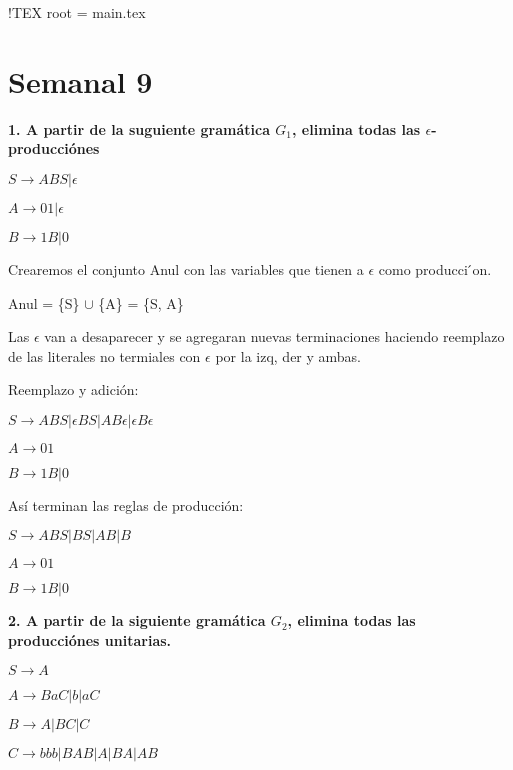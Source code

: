 !TEX root = main.tex
\renewcommand{\labelenumi}{\alph{enumi})}
\section*{Semanal 9}
\textbf{1. A partir de la suguiente gram\'atica $G_{1}$, elimina todas las $\epsilon$-producci\'ones}
\\
\begin{center}
    $S \rightarrow ABS | \epsilon$

    $A \rightarrow 01 | \epsilon$

    $B \rightarrow 1B | 0$

\end{center}

Crearemos el conjunto Anul con las variables que tienen a $\epsilon$ como producci ́on.

Anul = \{S\} $\cup$ \{A\} = \{S, A\}

Las $\epsilon$ van a desaparecer y se agregaran nuevas terminaciones haciendo reemplazo de las literales no termiales con $\epsilon$ por la izq, der y ambas.



Reemplazo y adici\'on:
\begin{center}
    $S \rightarrow ABS | \epsilon BS |  AB\epsilon | \epsilon B\epsilon $

    $A \rightarrow 01$

    $B \rightarrow 1B | 0$

\end{center}

As\'i terminan las reglas de producci\'on:

\begin{center}
    $S \rightarrow ABS | BS |  AB | B$

    $A \rightarrow 01$

    $B \rightarrow 1B | 0$

\end{center}


\textbf{2. A partir de la siguiente gram\'atica $G_{2}$, elimina todas las producci\'ones unitarias.}

\begin{center}
    $S \rightarrow A$

    $A \rightarrow BaC | b | aC$

    $B \rightarrow A | BC | C$

    $C \rightarrow bbb | BAB | A | BA | AB$
\end{center}

